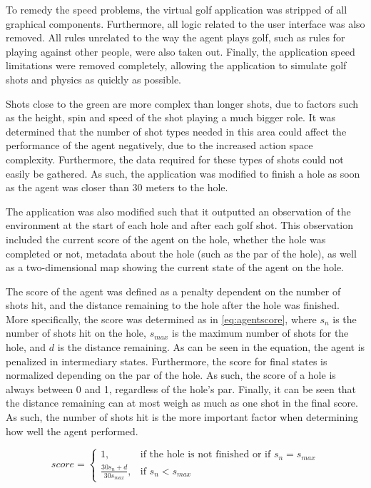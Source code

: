 \documentclass{kththesis}
\begin{document}
To remedy the speed problems, the virtual golf application was stripped of all graphical components. Furthermore, all logic related to the user interface was also removed. All rules unrelated to the way the agent plays golf, such as rules for playing against other people, were also taken out. Finally, the application speed limitations were removed completely, allowing the application to simulate golf shots and physics as quickly as possible.

Shots close to the green are more complex than longer shots, due to factors such as the height, spin and speed of the shot playing a much bigger role. It was determined that the number of shot types needed in this area could affect the performance of the agent negatively, due to the increased action space complexity. Furthermore, the data required for these types of shots could not easily be gathered. As such, the application was modified to finish a hole as soon as the agent was closer than 30 meters to the hole.

The application was also modified such that it outputted an observation of the environment at the start of each hole and after each golf shot. This observation included the current score of the agent on the hole, whether the hole was completed or not, metadata about the hole (such as the par of the hole), as well as a two-dimensional map showing the current state of the agent on the hole.

The score of the agent was defined as a penalty dependent on the number of shots hit, and the distance remaining to the hole after the hole was finished. More specifically, the score was determined as in \autoref{eq:agentscore}, where $s_n$ is the number of shots hit on the hole, $s_{max}$ is the maximum number of shots for the hole, and $d$ is the distance remaining. As can be seen in the equation, the agent is penalized in intermediary states. Furthermore, the score for final states is normalized depending on the par of the hole. As such, the score of a hole is always between 0 and 1, regardless of the hole's par. Finally, it can be seen that the distance remaining can at most weigh as much as one shot in the final score. As such, the number of shots hit is the more important factor when determining how well the agent performed. 

\begin{equation}
\label{eq:agentscore}
score = 
\begin{cases}
1,& \text{if the hole is not finished or if } s_n = s_{max}\\
\frac{30s_n + d}{30s_{max}},& \text{if } s_n < s_{max}
\end{cases}
\end{equation}
\end{document}

